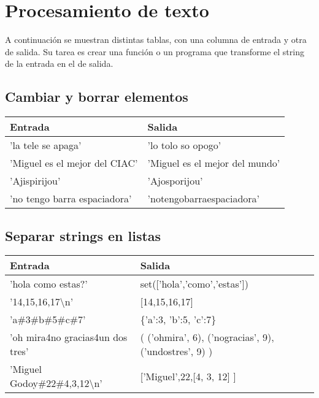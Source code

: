\section{Procesamiento de texto}
A continuación se muestran distintas tablas, con una columna de entrada y otra de salida. Su tarea es crear una función o un programa que transforme el string de la entrada en el de salida.

\subsection{Cambiar y borrar elementos}
\begin{table}[h]
	\centering
	\label{replace}
	\begin{tabular}{|l|l|}
		\hline
		\textbf{Entrada}              & \textbf{Salida}                \\ \hline
		'la tele se apaga'            & 'lo tolo so opogo'             \\ \hline
		'Miguel es el mejor del CIAC' & 'Miguel es el mejor del mundo' \\ \hline
		'Ajispirijou'                 & 'Ajosporijou'                  \\ \hline
		'no tengo barra espaciadora'  & 'notengobarraespaciadora'      \\ \hline
	\end{tabular}
\end{table}

\subsection{Separar strings en listas}

\begin{table}[h]
	\centering
	\label{split}
	\begin{tabular}{|l|l|}
		\hline
		\textbf{Entrada}                 & \textbf{Salida}                                       \\ \hline
		'hola como estas?'               & set({[}'hola','como','estas'{]})                      \\ \hline
		'14,15,16,17\textbackslash n'                  & {[}14,15,16,17{]}                                     \\ \hline
		'a\#3\#b\#5\#c\#7'               & \{'a':3, 'b':5, 'c':7\}                               \\ \hline
		'oh mira4no gracias4un dos tres' & ( ('ohmira', 6), ('nogracias', 9), ('undostres', 9) ) \\ \hline
		'Miguel Godoy\#22\#4,3,12\textbackslash n'     & {[}'Miguel',22,{[}4, 3, 12{]} {]}                     \\ \hline
	\end{tabular}
\end{table}

